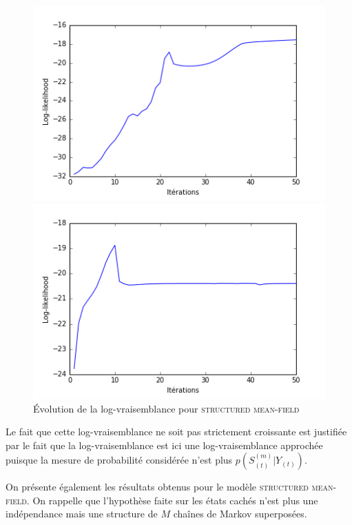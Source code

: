 \documentclass[10pt,a4paper]{article}
\newcommand{\meanfield}{\textsc{mean-field}}
\newcommand{\structmeanfield}{\textsc{structured mean-field}}
\begin{document}
\begin{figure}[H]
\centering
\begin{minipage}{.45\linewidth}
\centering
\includegraphics[scale=0.3]{../resources/pictures/M3_K2_meanfield.png}
\caption{Évolution de la log-vraisemblance pour \meanfield}
\end{minipage}
\begin{minipage}{.45\linewidth}
\centering
\includegraphics[scale=0.3]{../resources/pictures/M3_K2_structmeanfield.png}
\caption{Évolution de la log-vraisemblance pour \structmeanfield}
\end{minipage}
\end{figure}

Le fait que cette log-vraisemblance ne soit pas strictement croissante est 
justifiée par le fait que la log-vraisemblance est ici une log-vraisemblance 
approchée puisque la mesure de probabilité considérée n'est plus 
$p(S_{(t)}^{(m)} \vert Y_{(t)})$.

On présente également les résultats obtenus pour le modèle \structmeanfield. On rappelle
que l'hypothèse faite sur les états cachés n'est plus une indépendance mais une structure
 de $M$ chaînes de Markov superposées. 
\end{document}
